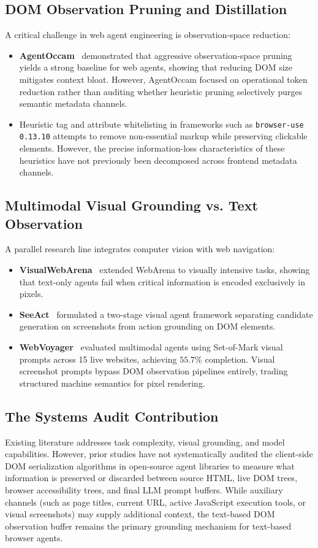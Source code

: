 \documentclass[11pt,a4paper]{article}
\begin{document}
\subsection{DOM Observation Pruning and Distillation}
A critical challenge in web agent engineering is observation-space reduction:
\begin{itemize}
    \item \textbf{AgentOccam}~\cite{agentoccam2025} demonstrated that aggressive observation-space pruning yields a strong baseline for web agents, showing that reducing DOM size mitigates context bloat. However, AgentOccam focused on operational token reduction rather than auditing whether heuristic pruning selectively purges semantic metadata channels.
    \item Heuristic tag and attribute whitelisting in frameworks such as \texttt{browser-use 0.13.10} attempts to remove non-essential markup while preserving clickable elements. However, the precise information-loss characteristics of these heuristics have not previously been decomposed across frontend metadata channels.
\end{itemize}

\subsection{Multimodal Visual Grounding vs. Text Observation}
A parallel research line integrates computer vision with web navigation:
\begin{itemize}
    \item \textbf{VisualWebArena}~\cite{koh2024visualwebarena} extended WebArena to visually intensive tasks, showing that text-only agents fail when critical information is encoded exclusively in pixels.
    \item \textbf{SeeAct}~\cite{zheng2024seeact} formulated a two-stage visual agent framework separating candidate generation on screenshots from action grounding on DOM elements.
    \item \textbf{WebVoyager}~\cite{he2024webvoyager} evaluated multimodal agents using Set-of-Mark visual prompts across 15 live websites, achieving $55.7\%$ completion. Visual screenshot prompts bypass DOM observation pipelines entirely, trading structured machine semantics for pixel rendering.
\end{itemize}

\subsection{The Systems Audit Contribution}
Existing literature addresses task complexity, visual grounding, and model capabilities. However, prior studies have not systematically audited the client-side DOM serialization algorithms in open-source agent libraries to measure what information is preserved or discarded between source HTML, live DOM trees, browser accessibility trees, and final LLM prompt buffers. While auxiliary channels (such as page titles, current URL, active JavaScript execution tools, or visual screenshots) may supply additional context, the text-based DOM observation buffer remains the primary grounding mechanism for text-based browser agents.
\end{document}

